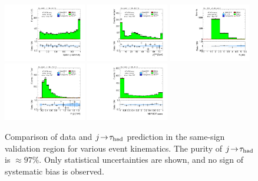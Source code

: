 \begin{figure}[tp]
  \includegraphics[width=0.32\textwidth]{figures/analysis/vbf-SSXCR/lep-eta-centrality}
  \includegraphics[width=0.32\textwidth]{figures/analysis/vbf-SSXCR/system-pt}
  \includegraphics[width=0.32\textwidth]{figures/analysis/vbf-SSXCR/n-jets30}
  \includegraphics[width=0.32\textwidth]{figures/analysis/vbf-SSXCR/dijet-m-veryhigh}
  \includegraphics[width=0.32\textwidth]{figures/analysis/vbf-SSXCR/BDTEve-VBF}
  \caption{Comparison of data and $j\!\rightarrow\!\tau_\text{had}$ prediction in the same-sign validation region for various event kinematics. The purity of $j\!\rightarrow\!\tau_\text{had}$ is $\approx\! 97\%$. Only statistical uncertainties are shown, and no sign of systematic bias is observed.}
  \label{fig:backgrounds-SSXCR-jets}
\end{figure}

\clearpage

